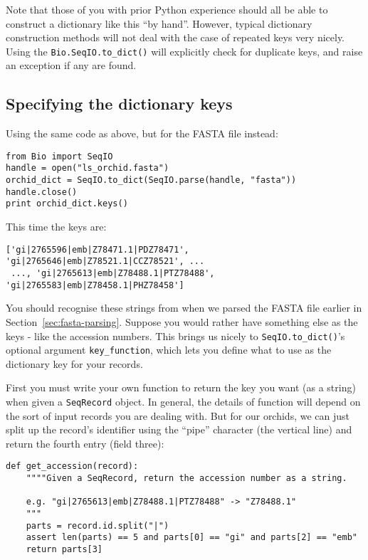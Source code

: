 \documentclass{report}
\begin{document}
Note that those of you with prior Python experience should all be able to construct a dictionary like this ``by hand''.  However, typical dictionary construction methods will not deal with the case of repeated keys very nicely.  Using the \verb|Bio.SeqIO.to_dict()| will explicitly check for duplicate keys, and raise an exception if any are found.

\subsection{Specifying the dictionary keys}
\label{seq:seqio-todict-functionkey}

Using the same code as above, but for the FASTA file instead:

\begin{verbatim}
from Bio import SeqIO
handle = open("ls_orchid.fasta")
orchid_dict = SeqIO.to_dict(SeqIO.parse(handle, "fasta"))
handle.close()
print orchid_dict.keys()
\end{verbatim}

\noindent This time the keys are:

\begin{verbatim}
['gi|2765596|emb|Z78471.1|PDZ78471', 'gi|2765646|emb|Z78521.1|CCZ78521', ...
 ..., 'gi|2765613|emb|Z78488.1|PTZ78488', 'gi|2765583|emb|Z78458.1|PHZ78458']
\end{verbatim}

You should recognise these strings from when we parsed the FASTA file earlier in Section~\ref{sec:fasta-parsing}.  Suppose you would rather have something else as the keys - like the accession numbers.  This brings us nicely to \verb|SeqIO.to_dict()|'s optional argument \verb|key_function|, which lets you define what to use as the dictionary key for your records.

First you must write your own function to return the key you want (as a string) when given a \verb|SeqRecord| object.  In general, the details of function will depend on the sort of input records you are dealing with.  But for our orchids, we can just split up the record's identifier using the ``pipe'' character (the vertical line) and return the fourth entry (field three):

\begin{verbatim}
def get_accession(record):
    """"Given a SeqRecord, return the accession number as a string.
  
    e.g. "gi|2765613|emb|Z78488.1|PTZ78488" -> "Z78488.1"
    """
    parts = record.id.split("|")
    assert len(parts) == 5 and parts[0] == "gi" and parts[2] == "emb"
    return parts[3]
\end{verbatim}
\end{document}
